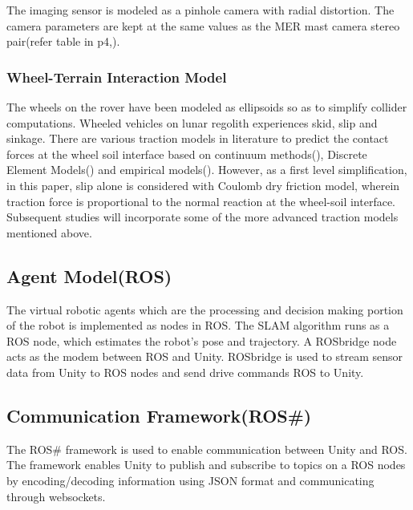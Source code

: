 \documentclass[a4paper, 10pt, conference]{ieeeconf}      %
\begin{document}
The imaging sensor is modeled as a pinhole camera with radial distortion. The camera parameters are kept at the same values as  the MER mast camera stereo pair(refer table in p4,\cite{maki2003mars}).

\subsubsection{Wheel-Terrain Interaction Model}
The wheels on the rover have been modeled as ellipsoids so as to simplify collider computations. Wheeled vehicles on lunar regolith experiences skid, slip and sinkage\cite{ding2009slip}. There are various traction models in literature to predict the contact forces at the wheel soil interface based on continuum  methods(\cite{bekker1964mechanics,wong1967behaviour,ding2015interaction}), Discrete Element Models(\cite{yoshida2003terramechanics,jeong2019development,rodriguez2019high,jiang2018experimental,jeong2019development}) and empirical models(\cite{huang2019sinkage,wong2012predicting}).  However, as a first level simplification, in this paper, slip alone is considered with Coulomb dry friction model, wherein traction force is proportional to the normal reaction at the wheel-soil interface. Subsequent studies will incorporate some of the more advanced traction models mentioned above.
\subsection{Agent Model(ROS)}
The virtual robotic agents which are the processing and decision making portion of the robot is implemented as nodes in ROS. The SLAM algorithm runs as a ROS node, which estimates the robot's pose and trajectory. A ROSbridge node\cite{crick2017rosbridge} acts as the modem between ROS and Unity. ROSbridge is used to stream sensor data from Unity  to ROS nodes  and send drive commands ROS to Unity.  
\subsection{Communication Framework(ROS\#)}
The ROS\# framework is used to enable communication between Unity and ROS. The framework enables Unity to publish and subscribe to topics on  a ROS nodes by encoding/decoding information using JSON format and communicating through websockets. 
\end{document}
